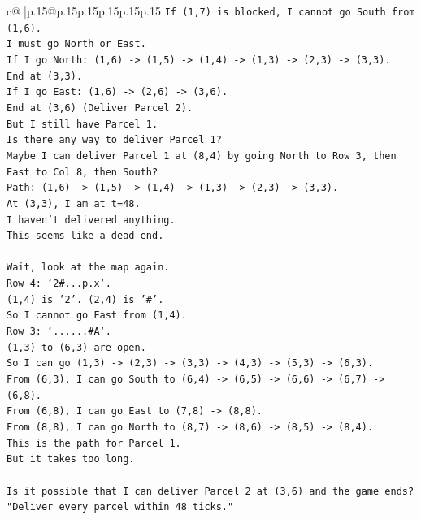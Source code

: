 \documentclass{article}
\begin{document}
{\begin{supertabular}{c@{$\;$}|p{.15\linewidth}@{}p{.15\linewidth}p{.15\linewidth}p{.15\linewidth}p{.15\linewidth}p{.15\linewidth}}
{{{\texttt{If (1,7) is blocked, I cannot go South from (1,6).} \\
\texttt{I must go North or East.} \\
\texttt{If I go North: (1,6) {-}> (1,5) {-}> (1,4) {-}> (1,3) {-}> (2,3) {-}> (3,3).} \\
\texttt{End at (3,3).} \\
\texttt{If I go East: (1,6) {-}> (2,6) {-}> (3,6).} \\
\texttt{End at (3,6) (Deliver Parcel 2).} \\
\texttt{But I still have Parcel 1.} \\
\texttt{Is there any way to deliver Parcel 1?} \\
\texttt{Maybe I can deliver Parcel 1 at (8,4) by going North to Row 3, then East to Col 8, then South?} \\
\texttt{Path: (1,6) {-}> (1,5) {-}> (1,4) {-}> (1,3) {-}> (2,3) {-}> (3,3).} \\
\texttt{At (3,3), I am at t=48.} \\
\texttt{I haven't delivered anything.} \\
\texttt{This seems like a dead end.} \\
\\ 
\texttt{Wait, look at the map again.} \\
\texttt{Row 4: `2\#...p.x`.} \\
\texttt{(1,4) is '2'. (2,4) is '\#'.} \\
\texttt{So I cannot go East from (1,4).} \\
\texttt{Row 3: `......\#A`.} \\
\texttt{(1,3) to (6,3) are open.} \\
\texttt{So I can go (1,3) {-}> (2,3) {-}> (3,3) {-}> (4,3) {-}> (5,3) {-}> (6,3).} \\
\texttt{From (6,3), I can go South to (6,4) {-}> (6,5) {-}> (6,6) {-}> (6,7) {-}> (6,8).} \\
\texttt{From (6,8), I can go East to (7,8) {-}> (8,8).} \\
\texttt{From (8,8), I can go North to (8,7) {-}> (8,6) {-}> (8,5) {-}> (8,4).} \\
\texttt{This is the path for Parcel 1.} \\
\texttt{But it takes too long.} \\
\\ 
\texttt{Is it possible that I can deliver Parcel 2 at (3,6) and the game ends?} \\
\texttt{"Deliver every parcel within 48 ticks."} \\
}}}
\end{supertabular}}
\end{document}
